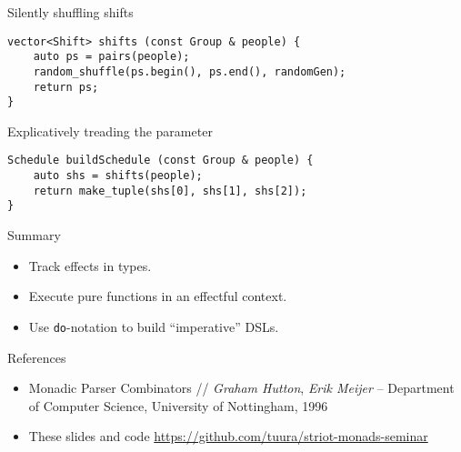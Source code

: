 \begin{frame}[fragile]{Silently shuffling shifts}
  \begin{block}{}
  \begin{verbatim}
vector<Shift> shifts (const Group & people) {
    auto ps = pairs(people);
    random_shuffle(ps.begin(), ps.end(), randomGen);
    return ps;
}
  \end{verbatim}
  \end{block}
\end{frame}

\begin{frame}[fragile]{Explicatively treading the parameter}
  \begin{block}{}
  \begin{verbatim}
Schedule buildSchedule (const Group & people) {
    auto shs = shifts(people);
    return make_tuple(shs[0], shs[1], shs[2]);
}
  \end{verbatim}
  \end{block}
\end{frame}

\begin{frame}[fragile]{Summary}
  \begin{itemize}
    \item Track effects in types.
    \item Execute pure functions in an effectful context.
    \item Use \texttt{do}-notation to build ``imperative'' DSLs.
  \end{itemize}
\end{frame}

\begin{frame}{References}

\begin{itemize}
  \item Monadic Parser Combinators // \textit{Graham Hutton}, \textit{Erik Meijer} – Department of Computer Science, University of Nottingham, 1996
  \item These slides and code \url{https://github.com/tuura/striot-monads-seminar}
\end{itemize}

\end{frame}


